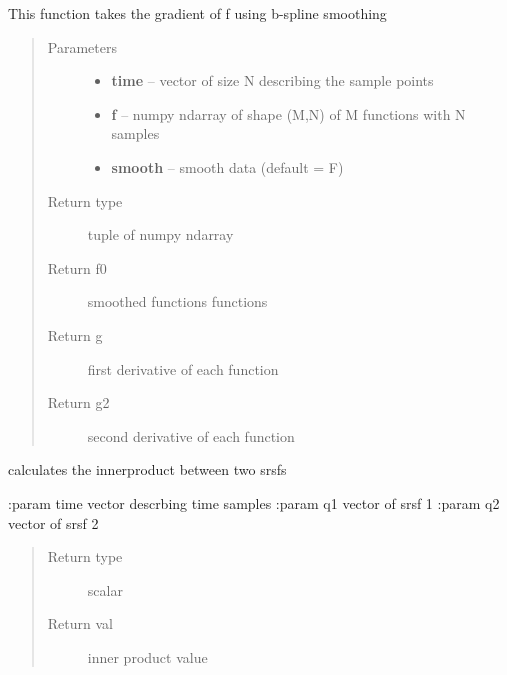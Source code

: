 \documentclass[letterpaper,10pt,english]{sphinxmanual}
\begin{document}
\begin{fulllineitems}
\label{utility_functions:utility_functions.gradient_spline}
This function takes the gradient of f using b-spline smoothing
\begin{quote}\begin{description}
\item[{Parameters}] \leavevmode\begin{itemize}
\item {} 
\textbf{time} -- vector of size N describing the sample points

\item {} 
\textbf{f} -- numpy ndarray of shape (M,N) of M functions with N samples

\item {} 
\textbf{smooth} -- smooth data (default = F)

\end{itemize}

\item[{Return type}] \leavevmode
tuple of numpy ndarray

\item[{Return f0}] \leavevmode
smoothed functions functions

\item[{Return g}] \leavevmode
first derivative of each function

\item[{Return g2}] \leavevmode
second derivative of each function

\end{description}\end{quote}

\end{fulllineitems}


\begin{fulllineitems}
\label{utility_functions:utility_functions.innerprod_q}
calculates the innerproduct between two srsfs

:param time vector descrbing time samples
:param q1 vector of srsf 1
:param q2 vector of srsf 2
\begin{quote}\begin{description}
\item[{Return type}] \leavevmode
scalar

\item[{Return val}] \leavevmode
inner product value

\end{description}\end{quote}

\end{fulllineitems}
\end{document}
